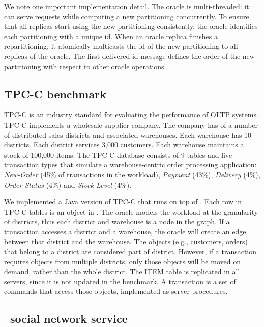We note one important implementation detail.  The oracle is multi-threaded: it
can serve requests while computing a new partitioning concurrently. To ensure
that all replicas start using the new partitioning consistently, the oracle
identifies each partitioning with a unique id.  When an oracle replica finishes
a repartitioning, it atomically multicasts the id of the new partitioning to
all replicas of the oracle.  The first delivered id message defines the order
of the new partitioning with respect to other oracle operations.


\subsection{TPC-C benchmark}
\label{sec:imp:tpcc}


TPC-C is an industry standard for evaluating the performance of OLTP systems.
TPC-C implements a wholesale supplier company. The company has of a number of
distributed sales districts and associated warehouses. Each warehouse has 10
districts. Each district services 3,000 customers. Each warehouse maintains a
stock of 100,000 items. The TPC-C database consists of 9 tables and five
transaction types that simulate a warehouse-centric order processing
application: \emph{New-Order} (45\% of transactions in the workload),
\emph{Payment} (43\%), \emph{Delivery} (4\%), \emph{Order-Status} (4\%) and
\emph{Stock-Level} (4\%).

We implemented a Java version of TPC-C that runs on top of \dynastar. Each row
in TPC-C tables is an object in \dynastar. The oracle models the workload at the
granularity of districts, thus each district and warehouse is a node in the
graph. If a transaction accesses a district and a warehouse, the oracle will
create an edge between that district and the warehouse. The objects (e.g.,
customers, orders) that belong to a district are considered part of district.
However, if a transaction requires objects from multiple districts, only those
objects will be moved on demand, rather than the whole district. The ITEM table
is replicated in all servers, since it is not updated in the benchmark. A
transaction is a set of commands that access those objects, implemented as
server procedures.

\subsection{\dynastarappname\ social network service}
\label{sec:imp:\dynastarappname}

